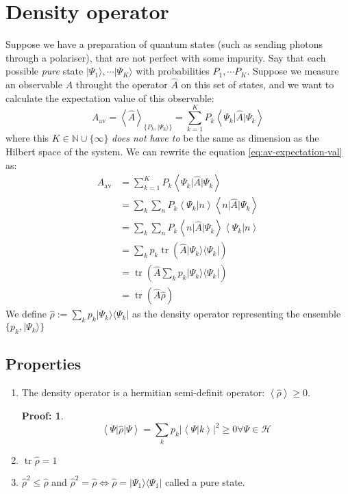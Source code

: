 \documentclass[12pt]{book}
\theoremstyle{definition}
\newtheorem*{prf}{Proof:}
\newcommand{\N}{\mathbb N}
\newcommand{\scalar}[1]{\left\langle {#1}\right\rangle}
\newcommand{\abs}[1]{\left\vert {#1}\right\vert}
\let\oldsum\sum
\renewcommand{\sum}[2]{\oldsum\limits_{#1}^{#2}}
\newcommand{\para}[1]{\left( {#1} \right)}
\newcommand{\bra}[1]{\langle {#1} \vert}
\newcommand{\ket}[1]{\vert {#1} \rangle}
\DeclareMathOperator{\tr}{tr}
\begin{document}
\section{Density operator}
Suppose we have a preparation of quantum states (such as sending photons through a polariser), that are not perfect with some impurity. Say that each possible \emph{pure} state $\ket{\Psi_1}, \cdots \ket{\Psi_K}$ with probabilities $P_1, \cdots P_K$. Suppose we measure an observable $A$ throught the operator $\hat A$ on this set of states, and we want to calculate the expectation value of this observable:
\begin{equation}
  A_{\textrm{av}} = \scalar{\hat A}_{\{P_k, \ket{\Psi_k}\}} = \sum{k=1}{K} P_k \scalar{\Psi_k \vert \hat A \vert \Psi_k} \label{eq:av-expectation-val}
\end{equation}
where this $K \in \N \cup \{\infty\}$ \emph{does not have to} be the same as dimension as the Hilbert space of the system. We can rewrite the equation \ref{eq:av-expectation-val} as:
\begin{align*}
 A_{\textrm{av}} & = \sum{k=1}{K} P_k \scalar{\Psi_k \vert \hat A \vert \Psi_k} \\
 & = \oldsum_k \oldsum_n P_k \scalar{\Psi_k \vert n} \scalar{n \vert \hat A \vert \Psi_k} \\
 & = \oldsum_k \oldsum_n P_k \scalar{n \vert \hat A \vert \Psi_k} \scalar{\Psi_k \vert n} \\
 & = \oldsum_k p_k \tr(\hat A \ket{\Psi_k} \bra{\Psi_k}) \\
 & = \tr\para{\hat A \oldsum_k p_k \ket{\Psi_k} \bra{\Psi_k}} \\
 & = \tr(\hat A \hat \rho)
\end{align*}
We define $\hat \rho := \oldsum_k p_k \ket{\Psi_k} \bra{\Psi_k}$ as the density operator representing the ensemble $\{p_k, \ket{\Psi_k}\}$

\subsection{Properties}
\begin{enumerate}[label = \alph*)]
  \item The density operator is a hermitian semi-definit operator: $\scalar{\hat \rho} \geq 0$. \\
  \begin{prf}
  \begin{equation*}
    \scalar{\Psi \vert \hat \rho \vert \Psi} = \oldsum_k p_k \abs{\scalar{\Psi \vert k}}^2 \geq 0 \forall \Psi \in \mathcal H
  \end{equation*}
  \end{prf}
  \item $\tr \hat \rho = 1$
  \item $\hat{\rho}^2 \leq \hat \rho$ and $\hat \rho^2 = \hat \rho \iff \hat \rho = \ket{\Psi_1}\bra{\Psi_1}$ called a pure state.
\end{enumerate}
\end{document}
